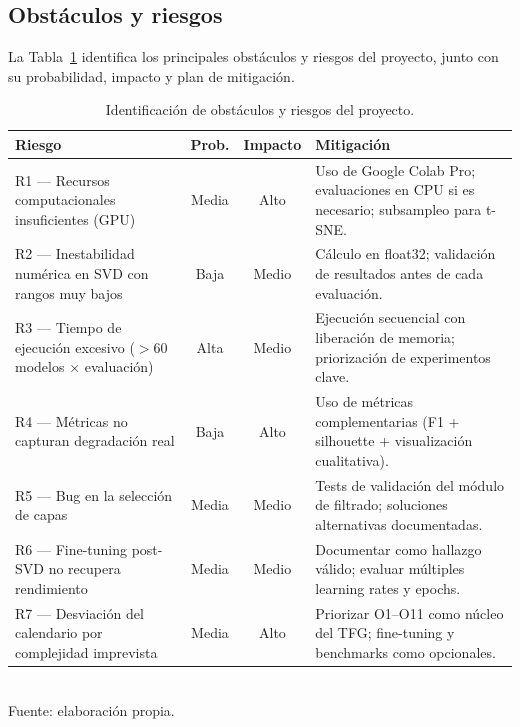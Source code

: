 \documentclass[11pt, a4paper]{article}
\begin{document}
\subsection{Obstáculos y riesgos}
\label{sec:riesgos}

La Tabla~\ref{tab:riesgos} identifica los principales obstáculos y riesgos del proyecto, junto con su probabilidad, impacto y plan de mitigación.

\begin{table}[H]
    \centering
    \caption{Identificación de obstáculos y riesgos del proyecto.}
    \label{tab:riesgos}
    \small
    \begin{tabular}{@{}p{3.8cm} c c p{5.5cm}@{}}
        \toprule
        \textbf{Riesgo} & \textbf{Prob.} & \textbf{Impacto} & \textbf{Mitigación} \\
        \midrule
        R1 --- Recursos computacionales insuficientes (GPU) & Media & Alto & Uso de Google Colab Pro; evaluaciones en CPU si es necesario; subsampleo para t-SNE. \\[0.2cm]
        R2 --- Inestabilidad numérica en SVD con rangos muy bajos & Baja & Medio & Cálculo en float32; validación de resultados antes de cada evaluación. \\[0.2cm]
        R3 --- Tiempo de ejecución excesivo ($>$60 modelos $\times$ evaluación) & Alta & Medio & Ejecución secuencial con liberación de memoria; priorización de experimentos clave. \\[0.2cm]
        R4 --- Métricas no capturan degradación real & Baja & Alto & Uso de métricas complementarias (F1 + silhouette + visualización cualitativa). \\[0.2cm]
        R5 --- Bug en la selección de capas & Media & Medio & Tests de validación del módulo de filtrado; soluciones alternativas documentadas. \\[0.2cm]
        R6 --- Fine-tuning post-SVD no recupera rendimiento & Media & Medio & Documentar como hallazgo válido; evaluar múltiples learning rates y epochs. \\[0.2cm]
        R7 --- Desviación del calendario por complejidad imprevista & Media & Alto & Priorizar O1--O11 como núcleo del TFG; fine-tuning y benchmarks como opcionales. \\
        \bottomrule
    \end{tabular}
    \\[0.15cm]{\small Fuente: elaboración propia.}
\end{table}

\end{document}
